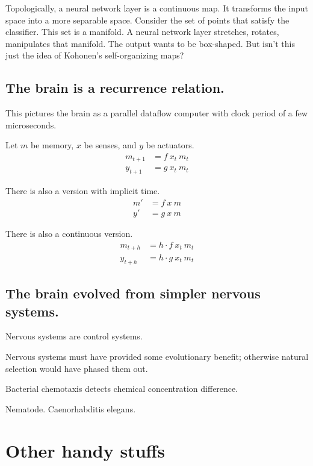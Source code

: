 
Topologically, a neural network layer is a continuous map.
It transforms the input space into a more separable space.
Consider the set of points that satisfy the classifier.
This set is a manifold.
A neural network layer stretches, rotates, manipulates that manifold.
The output wants to be box-shaped.
But isn't this just the idea of Kohonen's self-organizing maps?

\section{The brain is a recurrence relation.}

This pictures the brain as a parallel dataflow computer
with clock period of a few microseconds.


Let \(m\) be memory, \(x\) be senses, and \(y\) be actuators.
\begin{align*}
    m_{t+1} &= f~x_t~m_t
    \\
    y_{t+1} &= g~x_t~m_t
\end{align*}

There is also a version with implicit time.
\begin{align*}
    m' &= f~x~m
    \\
    y' &= g~x~m
\end{align*}

There is also a continuous version.
\begin{align*}
    m_{t+h} &= h \cdot f~x_t~m_t
    \\
    y_{t+h} &= h \cdot g~x_t~m_t
\end{align*}

\section{The brain evolved from simpler nervous systems.}

Nervous systems are control systems.

Nervous systems must have provided some evolutionary benefit;
otherwise natural selection would have phased them out.

Bacterial chemotaxis detects chemical concentration difference.

Nematode.
Caenorhabditis elegans.

\chapter{Other handy stuffs}

